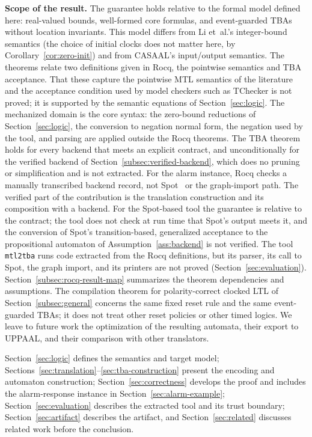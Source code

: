 \documentclass[manuscript]{acmart}
\newcommand{\runinhead}[1]{\par\noindent\textbf{#1}\enspace}
\begin{document}
\runinhead{Scope of the result.} The guarantee holds relative to the formal model defined here: real-valued bounds,
well-formed core formulas, and event-guarded TBAs without location
invariants. This model differs from Li et~al.'s integer-bound
semantics (the choice of initial clocks does not matter here, by Corollary~\ref{cor:zero-init}) and from
CASAAL's input/output semantics. The theorems relate two definitions given
in Rocq, the pointwise semantics and TBA acceptance. That these capture the
pointwise MTL semantics of the literature and the acceptance condition used by
model checkers such as TChecker is not proved; it is supported by the semantic
equations of Section~\ref{sec:logic}.
The mechanized domain is the core syntax: the zero-bound reductions of
Section~\ref{sec:logic}, the conversion to negation normal form, the negation
used by the tool, and parsing are applied outside the Rocq theorems.
The TBA theorem holds for every backend that
meets an explicit contract, and unconditionally for the verified
backend of Section~\ref{subsec:verified-backend}, which does no pruning or
simplification and is not extracted. For the alarm instance, Rocq checks a manually transcribed
backend record, not Spot~\cite{spot} or the graph-import path. The verified
part of the contribution is the translation construction and its composition
with a backend. For the Spot-based tool the guarantee is relative to the
contract; the tool does not check at run time that Spot's output meets it, and
the conversion of Spot's transition-based, generalized acceptance to the
propositional automaton of Assumption~\ref{ass:backend} is not verified. The
tool \texttt{mtl2tba} runs code extracted from the Rocq
definitions, but its parser, its call to Spot, the graph import, and its
printers are not proved
(Section~\ref{sec:evaluation}). Section~\ref{subsec:rocq-result-map}
summarizes the theorem dependencies and assumptions.
The compilation theorem for polarity-correct clocked LTL of Section~\ref{subsec:general} concerns the
same fixed reset rule and the same event-guarded TBAs; it does not treat other
reset policies or other timed logics.
We leave to future work the optimization of the resulting automata, their
export to UPPAAL, and their comparison with other translators.

Section~\ref{sec:logic} defines the semantics and target model;
Sections~\ref{sec:translation}--\ref{sec:tba-construction} present the encoding and
automaton construction; Section~\ref{sec:correctness} develops the proof and
includes the alarm-response instance in Section~\ref{sec:alarm-example};
Section~\ref{sec:evaluation} describes the extracted tool and its trust boundary; Section~\ref{sec:artifact} describes the artifact, and
Section~\ref{sec:related} discusses related work before the conclusion.
\end{document}
